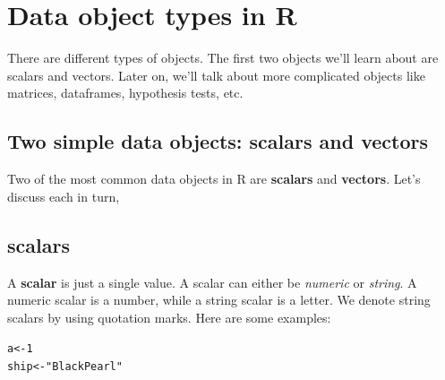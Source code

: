 \documentclass{tufte-book}\usepackage[]{graphicx}\usepackage[]{color}
\makeatletter
\newcommand{\hlnum}[1]{\textcolor[rgb]{0.686,0.059,0.569}{#1}}%
\newcommand{\hlstr}[1]{\textcolor[rgb]{0.192,0.494,0.8}{#1}}%
\newcommand{\hlstd}[1]{\textcolor[rgb]{0.345,0.345,0.345}{#1}}%
\newcommand{\hlkwb}[1]{\textcolor[rgb]{0.69,0.353,0.396}{#1}}%
\newenvironment{kframe}{%
 \def\at@end@of@kframe{}%
 \ifinner\ifhmode%
  \def\at@end@of@kframe{\end{minipage}}%
  \begin{minipage}{\columnwidth}%
 \fi\fi%
 \def\FrameCommand##1{\hskip\@totalleftmargin \hskip-\fboxsep
 \colorbox{shadecolor}{##1}\hskip-\fboxsep
     \hskip-\linewidth \hskip-\@totalleftmargin \hskip\columnwidth}%
 \MakeFramed {\advance\hsize-\width
   \@totalleftmargin\z@ \linewidth\hsize
   \@setminipage}}%
 {\par\unskip\endMakeFramed%
 \at@end@of@kframe}
\newenvironment{knitrout}{}{} %
\makeatother
\begin{document}


\section{Data object types in R}

There are different types of objects. The first two objects we'll learn about are scalars and vectors. Later on, we'll talk about more complicated objects like matrices, dataframes, hypothesis tests, etc.

\subsection{Two simple data objects: scalars and vectors}

Two of the most common data objects in R are \textbf{scalars} and \textbf{vectors}. Let's discuss each in turn,

\subsection{scalars}

A \textbf{scalar} is just a single value. A scalar can either be \textit{numeric} or \textit{string}. A numeric scalar is a number, while a string scalar is a letter. We denote string scalars by using quotation marks. Here are some examples:

\begin{knitrout}
\color{fgcolor}\begin{kframe}
\begin{alltt}
\hlstd{a} \hlkwb{<-} \hlnum{1}
\hlstd{ship} \hlkwb{<-} \hlstr{"Black Pearl"}
\end{alltt}
\end{kframe}
\end{knitrout}
\end{document}
